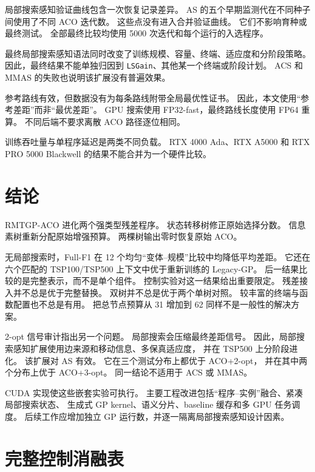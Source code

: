 \documentclass[letterpaper,journal]{IEEEtran}
\begin{document}
局部搜索感知验证曲线包含一次恢复记录差异。
AS 的五个早期监测代在不同种子间使用了不同 ACO 迭代数。
这些点没有进入合并验证曲线。
它们不影响育种或最终测试。
全部最终比较均使用 5000 次迭代和每个运行的入选程序。

最终局部搜索感知语法同时改变了训练规模、容量、终端、适应度和分阶段策略。
因此，最终结果不能单独归因到 \texttt{LSGain}、其他某一个终端或阶段计划。
ACS 和 MMAS 的失败也说明该扩展没有普遍效果。

参考路线有效，但数据没有为每条路线附带全局最优性证书。
因此，本文使用“参考差距”而非“最优差距”。
GPU 搜索使用 FP32-fast，最终路线长度使用 FP64 重算。
不同后端不要求离散 ACO 路径逐位相同。

训练吞吐量与单程序延迟是两类不同负载。
RTX 4000 Ada、RTX A5000 和 RTX PRO 5000 Blackwell 的结果不能合并为一个硬件比较。

\section{结论}

RMTGP-ACO 进化两个强类型残差程序。
状态转移树修正原始选择分数。
信息素树重新分配原始增强预算。
两棵树输出零时恢复原始 ACO。

无局部搜索时，Full-F1 在 12 个均匀“变体--规模”比较中均降低平均差距。
它还在六个匹配的 TSP100/TSP500 上下文中优于重新训练的 Legacy-GP。
后一结果比较的是完整表示，而不是单个组件。
控制实验对这一结果给出重要限定。
残差接入并不总是优于完整替换。
双树并不总是优于两个单树对照。
较丰富的终端与函数配置也不总是有用。
把总节点预算从 31 增加到 62 同样不是一般性的解决方案。

2-opt 信号审计指出另一个问题。
局部搜索会压缩最终差距信号。
因此，局部搜索感知扩展使用边来源和移动信息、多保真适应度，
并在 TSP500 上分阶段进化。
该扩展对 AS 有效。
它在三个测试分布上都优于 ACO+2-opt，
并在其中两个分布上优于 ACO+3-opt。
同一结论不适用于 ACS 或 MMAS。

CUDA 实现使这些嵌套实验可执行。
主要工程改进包括“程序--实例”融合、紧凑局部搜索状态、
生成式 GP kernel、语义分片、baseline 缓存和多 GPU 任务调度。
后续工作应增加独立 GP 运行数，并逐一隔离局部搜索感知设计因素。

\appendices

\section{完整控制消融表}

\begin{table}[h]
\caption{残差状态转移减去匹配完整替换 (pp)}
\label{tab:appendix-residual-zh}
\centering
\scriptsize
{}
\end{table}
\end{document}

